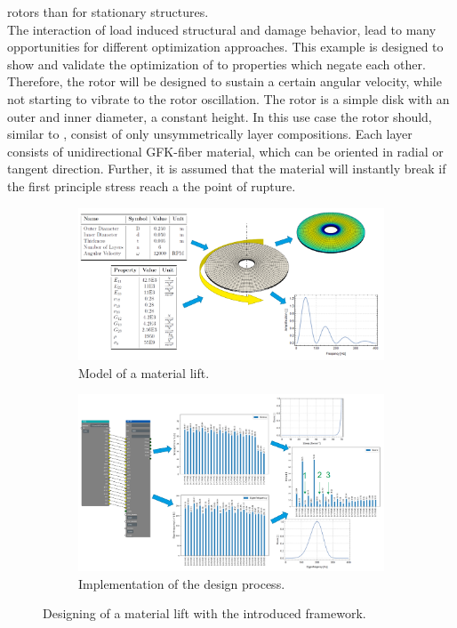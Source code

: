rotors than for stationary structures.\cite{filippatos_damage_2017}\\
The interaction of load induced structural and damage behavior, lead to many opportunities for different optimization approaches. 
This example is designed to show and validate the optimization of to properties which negate each other.
Therefore, the rotor will be designed to sustain a certain angular velocity, while not starting to vibrate to the rotor oscillation.
The rotor is a simple disk with an outer and inner diameter, a constant height.
In this use case the rotor should, similar to \cite{Filippatos2021}, consist of only unsymmetrically layer compositions.
Each layer consists of unidirectional GFK-fiber material,
which can be oriented in radial or tangent direction.
Further, it is assumed that the material will instantly break if the first principle stress reach a the point of rupture.
\begin{figure}[h]
    \centering
    \begin{subfigure}[b]{0.45\textwidth}
        \centering
        \includegraphics[width=\textwidth]{pics/rotor_model.png}
        \caption{\label{pic:rotor_model} Model of a material lift.}
    \end{subfigure}
    \hfill
    \begin{subfigure}[b]{0.5\textwidth}
        \centering
        \includegraphics[width=\textwidth]{pics/rotor_solution.png}
        \caption{\label{pic:rotor_solution} Implementation of the design process.}
    \end{subfigure}
    \caption{\label{pic:rotor} Designing of a material lift with the introduced framework.}
\end{figure}\\
